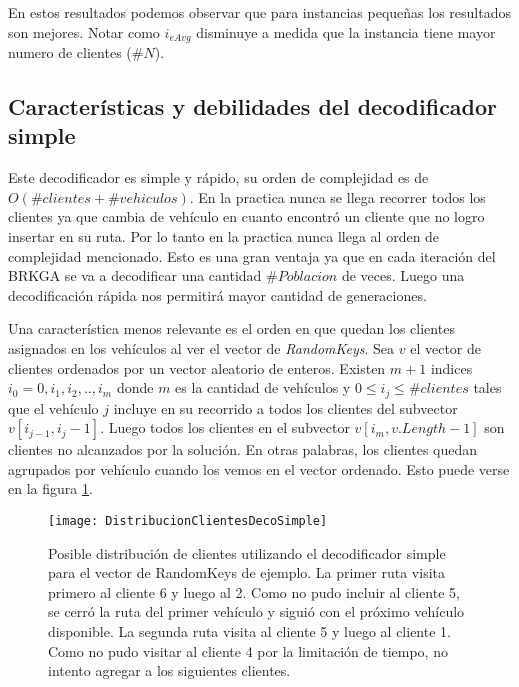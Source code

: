 En estos resultados podemos observar que para instancias pequeñas los resultados son mejores. Notar como $i_{eAvg}$ disminuye a medida que la instancia tiene mayor numero de clientes ($\#N$).

\subsection{Características y debilidades del decodificador simple}

Este decodificador es simple y rápido, su orden de complejidad es de $O(\#clientes + \#vehiculos)$. En la practica nunca se llega recorrer todos los clientes ya que cambia de vehículo en cuanto encontró un cliente que no logro insertar en su ruta. Por lo tanto en la practica nunca llega al orden de complejidad mencionado. Esto es una gran ventaja ya que en cada iteración del BRKGA se va a decodificar una cantidad $\#Poblacion$ de veces. Luego una decodificación rápida nos permitirá mayor cantidad de generaciones.

\bigskip

Una característica menos relevante es el orden en que quedan los clientes asignados en los vehículos al ver el vector de \textit{RandomKeys}.  Sea $v$ el vector de clientes ordenados por un vector aleatorio de enteros. Existen $m+1$ indices $i_0 = 0, i_1, i_2, .., i_m$ donde $m$ es la cantidad de vehículos y $0 \leq i_j \leq \#clientes$ tales que el vehículo $j$ incluye en su recorrido a todos los clientes del subvector $v[i_{j-1}, i_j-1]$. Luego todos los clientes en el subvector $v[i_m, v.Length - 1]$ son clientes no alcanzados por la solución. En otras palabras, los clientes quedan agrupados por vehículo cuando los vemos en el vector ordenado. Esto puede verse en la figura \ref{fig:DistribucionClientesDecoSimple}.

\begin{figure}[h]
	\caption{Posible distribución de clientes utilizando el decodificador simple para el vector de RandomKeys de ejemplo. La primer ruta visita primero al cliente 6 y luego al 2. Como no pudo incluir al cliente 5, se cerró la ruta del primer vehículo y siguió con el próximo vehículo disponible. La segunda ruta visita al cliente 5 y luego al cliente 1. Como no pudo visitar al cliente 4 por la limitación de tiempo, no intento agregar a los siguientes clientes.}
	\centering
	\texttt{[image: DistribucionClientesDecoSimple]}
	\label{fig:DistribucionClientesDecoSimple}
\end{figure}

